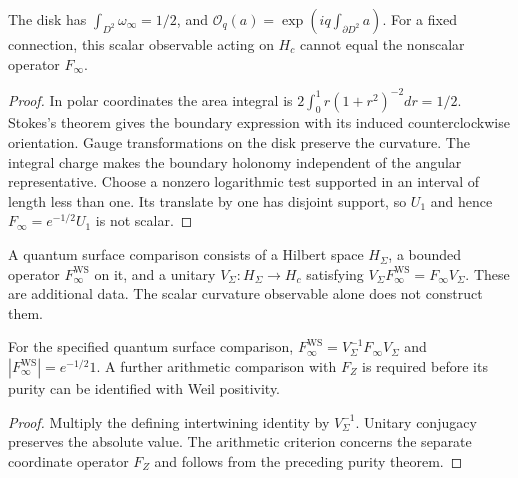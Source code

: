 \begin{proposition}
The disk has $\int_{D^2}\omega_\infty=1/2$, and
$\mathcal O_q(a)=\exp(iq\int_{\partial D^2}a)$.
For a fixed connection, this scalar observable acting on $H_c$
cannot equal the nonscalar operator $F_\infty$.
\end{proposition}
\begin{proof}
In polar coordinates the area integral is
$2\int_0^1 r(1+r^2)^{-2}dr=1/2$.
Stokes's theorem gives the boundary expression with its induced
counterclockwise orientation. Gauge transformations on the disk
preserve the curvature. The integral charge makes the boundary
holonomy independent of the angular representative.
Choose a nonzero logarithmic test supported in an interval of length
less than one. Its translate by one has disjoint support, so $U_1$
and hence $F_\infty=e^{-1/2}U_1$ is not scalar.
\end{proof}

\begin{definition}
\label{v4-arith:w9-r2:def:F-infty-WS}
A quantum surface comparison consists of a Hilbert space $H_\Sigma$,
a bounded operator $F_\infty^{\mathrm{WS}}$ on it, and a unitary
$V_\Sigma:H_\Sigma\to H_c$ satisfying
$V_\Sigma F_\infty^{\mathrm{WS}}=F_\infty V_\Sigma$.
These are additional data. The scalar curvature observable alone
does not construct them.
\end{definition}

\begin{proposition}
\label{v4-arith:w9-r2:thm:WS-equals-scaling}
For the specified quantum surface comparison,
$F_\infty^{\mathrm{WS}}=V_\Sigma^{-1}F_\infty V_\Sigma$ and
$|F_\infty^{\mathrm{WS}}|=e^{-1/2}1$.
A further arithmetic comparison with $F_Z$ is required before its
purity can be identified with Weil positivity.
\end{proposition}
\begin{proof}
Multiply the defining intertwining identity by $V_\Sigma^{-1}$.
Unitary conjugacy preserves the absolute value.
The arithmetic criterion concerns the separate coordinate operator
$F_Z$ and follows from the preceding purity theorem.
\end{proof}
